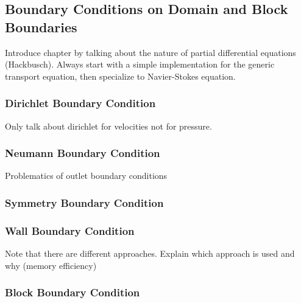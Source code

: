     \subsection{Boundary Conditions on Domain and Block Boundaries}

        Introduce chapter by talking about the nature of partial differential equations (Hackbusch). Always start with a simple implementation for the generic transport equation, then specialize to Navier-Stokes equation.

      \subsubsection{Dirichlet Boundary Condition}

        Only talk about dirichlet for velocities not for pressure.

      \subsubsection{Neumann Boundary Condition}

        Problematics of outlet boundary conditions

      \subsubsection{Symmetry Boundary Condition}

      \subsubsection{Wall Boundary Condition}

      Note that there are different approaches. Explain which approach is used and why (memory efficiency)

      \subsubsection{Block Boundary Condition}
      
